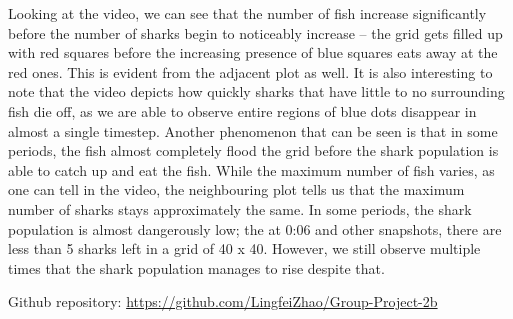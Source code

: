 \documentclass{article}
\begin{document}
Looking at the video, we can see that the number of fish increase significantly before the number of sharks begin to noticeably increase -- the grid gets filled up with red squares before the increasing presence of blue squares eats away at the red ones. This is evident from the adjacent plot as well. It is also interesting to note that the video depicts how quickly sharks that have little to no surrounding fish die off, as we are able to observe entire regions of blue dots disappear in almost a single timestep. Another phenomenon that can be seen is that in some periods, the fish almost completely flood the grid before the shark population is able to catch up and eat the fish. While the maximum number of fish varies, as one can tell in the video, the neighbouring plot tells us that the maximum number of sharks stays approximately the same. In some periods, the shark population is almost dangerously low; the at 0:06 and other snapshots, there are less than 5 sharks left in a grid of
40 x 40. However, we still observe multiple times that the shark population manages to rise despite that.\par
\bigskip
\noindent Github repository: \url{https://github.com/LingfeiZhao/Group-Project-2b}
\end{document}
